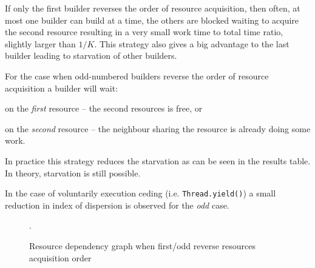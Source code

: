 \documentclass[12pt]{article}
\begin{document}
If only the first builder reverses the order of resource acquisition, then
often, at most one builder can build at a time, the others are blocked waiting
to acquire the second resource resulting in a very small work time to
total time ratio, slightly larger than $1/K$. This strategy also gives a big advantage to
the last builder leading to starvation of other builders.

For the case when odd-numbered builders reverse the order of resource
acquisition a builder will wait:
\begin{inparaenum}
\item on the \emph{first} resource -- the second resources is free, or
\item on the \emph{second} resource -- the neighbour sharing the
resource is already doing some work.
\end{inparaenum} In practice this strategy reduces the starvation as can
be seen in the results table. In theory, starvation is still possible.

In the case of voluntarily execution ceding (i.e. \texttt{Thread.yield()})
a small reduction in index of dispersion is observed for the \emph{odd}
case.

\begin{figure}
  \centering
  \caption{Resource dependency graph when first/odd reverse resources
  acquisition order}
  \label{fig:builders}.
\end{figure}
\end{document}
